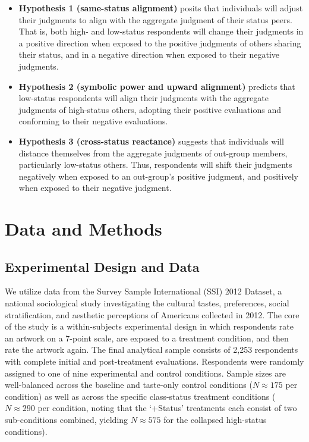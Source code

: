 \documentclass[12pt, letterpaper]{article}
\begin{document}
\begin{itemize}

\item \textbf{Hypothesis 1 (same-status alignment)} posits that individuals will adjust their judgments to align with the aggregate judgment of their status peers. That is, both high- and low-status respondents will change their judgments in a positive direction when exposed to the positive judgments of others sharing their status, and in a negative direction when exposed to their negative judgments. 

\item \textbf{Hypothesis 2 (symbolic power and upward alignment)} predicts that low-status respondents will align their judgments with the aggregate judgments of high-status others, adopting their positive evaluations and conforming to their negative evaluations. 

\item \textbf{Hypothesis 3 (cross-status reactance)} suggests that individuals will distance themselves from the aggregate judgments of out-group members, particularly low-status others. Thus, respondents will shift their judgments negatively when exposed to an out-group's positive judgment, and positively when exposed to their negative judgment.
\end{itemize}
\section{Data and Methods}

\subsection{Experimental Design and Data}
We utilize data from the Survey Sample International (SSI) 2012 Dataset, a national sociological study investigating the cultural tastes, preferences, social stratification, and aesthetic perceptions of Americans collected in 2012. The core of the study is a within-subjects experimental design in which respondents rate an artwork on a 7-point scale, are exposed to a treatment condition, and then rate the artwork again. The final analytical sample consists of 2,253 respondents with complete initial and post-treatment evaluations. Respondents were randomly assigned to one of nine experimental and control conditions. Sample sizes are well-balanced across the baseline and taste-only control conditions ($N \approx 175$ per condition) as well as across the specific class-status treatment conditions ($N \approx 290$ per condition, noting that the `+Status' treatments each consist of two sub-conditions combined, yielding $N \approx 575$ for the collapsed high-status conditions).
\end{document}
